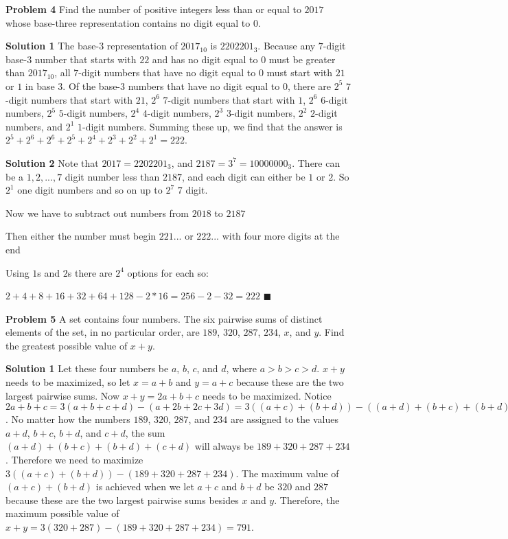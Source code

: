 \documentclass[a4paper,11pt]{article}
\begin{document}
\textbf{ Problem 4}
Find the number of positive integers less than or equal to $2017$ whose base-three representation contains no digit equal to $0$.


\textbf{Solution 1}
The base-$3$ representation of $2017_{10}$ is $2202201_3$. Because any $7$-digit base-$3$ number that starts with $22$ and has no digit equal to $0$ must be greater than $2017_{10}$, all $7$-digit numbers that have no digit equal to $0$ must start with $21$ or $1$ in base $3$. Of the base-$3$ numbers that have no digit equal to $0$, there are $2^5$ $7$-digit numbers that start with $21$, $2^6$ $7$-digit numbers that start with $1$, $2^6$ $6$-digit numbers, $2^5$ $5$-digit numbers, $2^4$ $4$-digit numbers, $2^3$ $3$-digit numbers, $2^2$ $2$-digit numbers, and $2^1$ $1$-digit numbers. Summing these up, we find that the answer is $2^5+2^6+2^6+2^5+2^4+2^3+2^2+2^1=\boxed{222}$.


\textbf{Solution 2}
Note that $2017=2202201_{3}$, and $2187=3^7=10000000_{3}$. There can be a $1,2,...,7$ digit number less than $2187$, and each digit can either be $1$ or $2$. So $2^1$ one digit numbers and so on up to $2^7$ $7$ digit.


Now we have to subtract out numbers from $2018$ to $2187$

Then either the number must begin $221...$ or $222...$ with four more digits at the end

Using $1$s and $2$s there are $2^4$ options for each so:

$2+4+8+16+32+64+128-2*16=256-2-32=\boxed{222}$ \hfill $\blacksquare$

\textbf{Problem 5}
A set contains four numbers. The six pairwise sums of distinct elements of the set, in no particular order, are $189$, $320$, $287$, $234$, $x$, and $y$. Find the greatest possible value of $x+y$.

\textbf{Solution 1}
Let these four numbers be $a$, $b$, $c$, and $d$, where $a>b>c>d$. $x+y$ needs to be maximized, so let $x=a+b$ and $y=a+c$ because these are the two largest pairwise sums. Now $x+y=2a+b+c$ needs to be maximized. Notice $2a+b+c=3(a+b+c+d)-(a+2b+2c+3d)=3((a+c)+(b+d))-((a+d)+(b+c)+(b+d)+(c+d))$. No matter how the numbers $189$, $320$, $287$, and $234$ are assigned to the values $a+d$, $b+c$, $b+d$, and $c+d$, the sum $(a+d)+(b+c)+(b+d)+(c+d)$ will always be $189+320+287+234$. Therefore we need to maximize $3((a+c)+(b+d))-(189+320+287+234)$. The maximum value of $(a+c)+(b+d)$ is achieved when we let $a+c$ and $b+d$ be $320$ and $287$ because these are the two largest pairwise sums besides $x$ and $y$. Therefore, the maximum possible value of $x+y=3(320+287)-(189+320+287+234)=\boxed{791}$.
\end{document}
